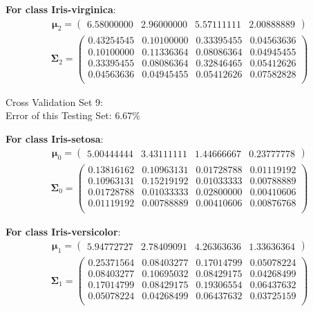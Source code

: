 \documentclass[11pt,a4paper]{article}
\newcommand{\htab}{\hspace*{0.63cm}}
\newcommand{\bs}[1]{\boldsymbol{#1}}
\begin{document}
\textbf{For class Iris-virginica}:
\begin{align} \bs{\mu}_{2} = \begin{pmatrix} 
6.58000000 & 2.96000000 & 5.57111111 & 2.00888889 
 \end{pmatrix}  \end{align} 
\vspace{-1cm}
\begin{align} \bs{\Sigma}_{2} = \begin{pmatrix} 
0.43254545 & 0.10100000 & 0.33395455 & 0.04563636 \\ 
0.10100000 & 0.11336364 & 0.08086364 & 0.04945455 \\ 
0.33395455 & 0.08086364 & 0.32846465 & 0.05412626 \\ 
0.04563636 & 0.04945455 & 0.05412626 & 0.07582828 \\ 
\end{pmatrix} \end{align}

\newpage

Cross Validation Set 9: \\
\htab Error of this Testing Set: $6.67\%$ 

\textbf{For class Iris-setosa}:
\begin{align} \bs{\mu}_{0} = \begin{pmatrix} 
5.00444444 & 3.43111111 & 1.44666667 & 0.23777778 
 \end{pmatrix}  \end{align} 
\vspace{-1cm}
\begin{align} \bs{\Sigma}_{0} = \begin{pmatrix} 
0.13816162 & 0.10963131 & 0.01728788 & 0.01119192 \\ 
0.10963131 & 0.15219192 & 0.01033333 & 0.00788889 \\ 
0.01728788 & 0.01033333 & 0.02800000 & 0.00410606 \\ 
0.01119192 & 0.00788889 & 0.00410606 & 0.00876768 \\ 
\end{pmatrix} \end{align}

\textbf{For class Iris-versicolor}:
\begin{align} \bs{\mu}_{1} = \begin{pmatrix} 
5.94772727 & 2.78409091 & 4.26363636 & 1.33636364 
 \end{pmatrix}  \end{align} 
\vspace{-1cm}
\begin{align} \bs{\Sigma}_{1} = \begin{pmatrix} 
0.25371564 & 0.08403277 & 0.17014799 & 0.05078224 \\ 
0.08403277 & 0.10695032 & 0.08429175 & 0.04268499 \\ 
0.17014799 & 0.08429175 & 0.19306554 & 0.06437632 \\ 
0.05078224 & 0.04268499 & 0.06437632 & 0.03725159 \\ 
\end{pmatrix} \end{align}
\end{document}
